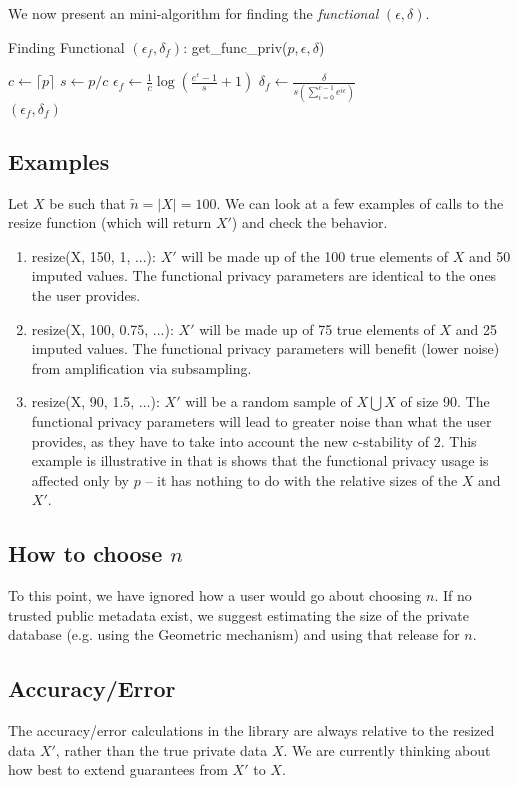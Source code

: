 \documentclass[11pt]{scrartcl} %
\begin{document}
We now present an mini-algorithm for finding the \emph{functional} $(\epsilon, \delta)$.
\begin{algorithm}
    \caption{Finding Functional $(\epsilon_f, \delta_f)$: get\_func\_priv($p, \epsilon, \delta$)}
    \label{alg:finding_functional_privacy}
    \begin{algorithmic}[1]
        \State $c \gets \lceil p \rceil$ 
        \State $s \gets p/c$ 
        \State $\epsilon_{f} \gets \frac{1}{c}\log\left(\frac{e^{\epsilon}-1}{s} + 1\right)$
        \State $\delta_{f} \gets \frac{\delta}{s\left(\sum_{i=0}^{c-1}e^{i \epsilon}\right)}$
        \\ \Return $(\epsilon_{f}, \delta_{f})$ 
    \end{algorithmic}
\end{algorithm}

\subsection{Examples} \label{subsec:examples}
Let $X$ be such that $\tilde{n} = \vert X \vert = 100$. We can look at a few examples of calls to the resize function (which will return $X'$) and check the behavior.
\begin{enumerate}
    \item resize(X, 150, 1, ...): $X'$ will be made up of the 100 true elements of $X$ and 50 imputed values. The functional privacy parameters are identical to the ones the user provides. 
    \item resize(X, 100, 0.75, ...): $X'$ will be made up of 75 true elements of $X$ and 25 imputed values. The functional privacy parameters will benefit (lower noise) from amplification via subsampling.
    \item resize(X, 90, 1.5, ...): $X'$ will be a random sample of $X \bigcup X$ of size 90. 
            The functional privacy parameters will lead to greater noise than what the user provides, as they have to take into account the new c-stability of $2$. 
            This example is illustrative in that is shows that the functional privacy usage is affected only by $p$ -- it has nothing to do with the relative sizes of the $X$ and $X'$.
\end{enumerate}

\subsection{How to choose $n$} \label{subsec:choosing_n}
To this point, we have ignored how a user would go about choosing $n$. If no trusted public metadata exist, we 
suggest estimating the size of the private database (e.g. using the Geometric mechanism) and using that release 
for $n$.  

\subsection{Accuracy/Error}
The accuracy/error calculations in the library are always relative to the resized data $X'$, rather than the true private data $X$. 
We are currently thinking about how best to extend guarantees from $X'$ to $X$.



\end{document}

